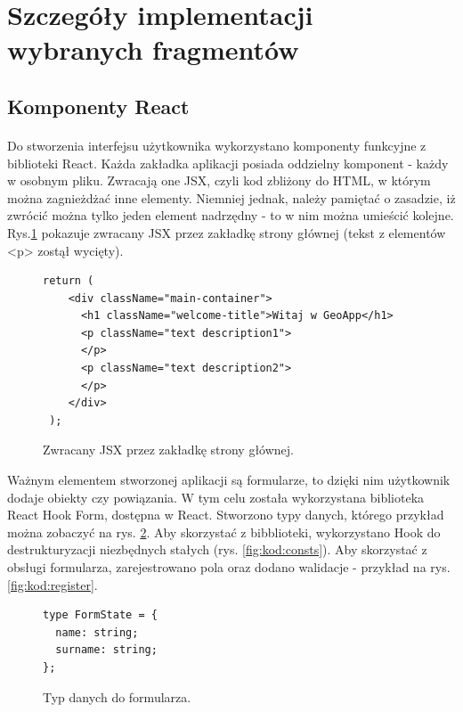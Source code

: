 \section{Szczegóły implementacji wybranych fragmentów}

\subsection{Komponenty React}
\paragraph{}
Do stworzenia interfejsu użytkownika wykorzystano komponenty funkcyjne z biblioteki React. Każda zakładka aplikacji posiada oddzielny komponent - każdy w osobnym pliku. Zwracają one JSX, czyli kod zbliżony do HTML, w którym można zagnieżdżać inne elementy. Niemniej jednak, należy pamiętać o zasadzie, iż zwrócić można tylko jeden element nadrzędny - to w nim można umieścić kolejne. Rys.\ref{fig:kod:jsx} pokazuje zwracany JSX przez zakładkę strony głównej (tekst z elementów <p> zostął wycięty).

\begin{figure}
\centering
\begin{lstlisting}
return (
    <div className="main-container">
      <h1 className="welcome-title">Witaj w GeoApp</h1>
      <p className="text description1">
      </p>
      <p className="text description2">
      </p>
    </div>
 );
\end{lstlisting}
\caption{Zwracany JSX przez zakładkę strony głównej.}
\label{fig:kod:jsx}
\end{figure}


Ważnym elementem stworzonej aplikacji są formularze, to dzięki nim użytkownik dodaje obiekty czy powiązania. W tym celu została wykorzystana biblioteka React Hook Form, dostępna w React. Stworzono typy danych, którego przykład można zobaczyć na rys. \ref{fig:kod:formType}. Aby skorzystać z bibblioteki, wykorzystano Hook do destrukturyzacji niezbędnych stałych (rys. \ref{fig:kod:consts}). Aby skorzystać z obsługi formularza, zarejestrowano pola oraz dodano walidacje - przykład na rys. \ref{fig:kod:register}.

\begin{figure}
\centering
\begin{lstlisting}
type FormState = {
  name: string;
  surname: string;
};
\end{lstlisting}
\caption{Typ danych do formularza.}
\label{fig:kod:formType}
\end{figure}

